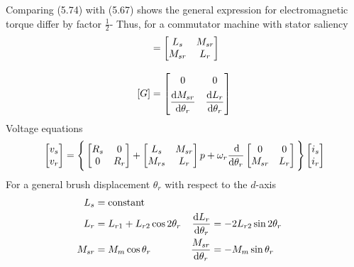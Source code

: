 \documentclass[a4paper,numbers=noenddot,12pt]{scrbook}
\begin{document}
        Comparing (5.74) with (5.67) shows the general expression for electromagnetic torque differ by factor $\frac{1}{2}$-
        Thus, for a commutator machine with stator saliency
        \begin{align*}
            [L] & = 
            \begin{bmatrix}
                L_s & M_{sr} \\
                M_{sr} & L_r
            \end{bmatrix} \\[2ex]
            [G] & = 
            \begin{bmatrix}
                0 & 0 \\[1ex]
                \dfrac{\dif M_{sr}}{\dif \theta_r} & \dfrac{\dif L_{r}}{\dif \theta_r} 
            \end{bmatrix}
        \end{align*}
        Voltage equations
        \begin{equation}
            \begin{bmatrix}
                v_s \\ v_r
            \end{bmatrix} = \Bigg\{
                \begin{bmatrix}
                    R_s & 0 \\ 0 & R_r 
                \end{bmatrix} +
                \begin{bmatrix}
                    L_s & M_{sr} \\
                    M_{rs} & L_{r}
                \end{bmatrix}p \\
                + \omega_r \frac{\dif}{\dif \theta_r}
                \begin{bmatrix}
                    0 & 0 \\
                    M_{sr} & L_{r}
                \end{bmatrix}
            \Bigg\}
            \begin{bmatrix}
                i_s \\
                i_r
            \end{bmatrix}
        \end{equation}
        For a general brush displacement $\theta_r$ with respect to the $d$-axis
        \begin{align*}
            L_s & = \text{constant} \\
            L_r & = L_{r1} + L_{r2} \cos 2 \theta_r & \frac{\dif L_r}{\dif \theta_r} & = - 2 L_{r2} \sin 2 \theta_r \\
            M_{sr} & = M_m \cos \theta_r &  \frac{M_{sr}}{\dif \theta_r} & = - M_m \sin \theta_r 
        \end{align*}
\end{document}
